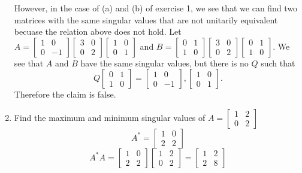 \documentclass[12pt]{article}
\numberwithin{equation}{section}
\begin{document}
\begin{enumerate}
    However, in the case of (a) and (b) of exercise 1, we see that we can find two matrices with the same singular values that are not unitarily equivalent becuase the relation above does not hold. Let $A=\left[\begin{array}{cc}1&0\\0&-1\end{array}\right]\left[\begin{array}{cc}3&0\\0&2\end{array}\right]\left[\begin{array}{cc}1&0\\0&1\end{array}\right]$ and $B=\left[\begin{array}{cc}0&1\\1&0\end{array}\right]\left[\begin{array}{cc}3&0\\0&2\end{array}\right]\left[\begin{array}{cc}0&1\\1&0\end{array}\right]$. We see that $A$ and $B$ have the same singular values, but there is no $Q$ such that
    $$Q\left[\begin{array}{cc}0&1\\1&0\end{array}\right]=\left[\begin{array}{cc}1&0\\0&-1\end{array}\right],\left[\begin{array}{cc}1&0\\0&1\end{array}\right].$$
    Therefore the claim is false.
\item Find the maximum and minimum singular values of $A=\left[\begin{array}{cc}1&2\\0&2\end{array}\right]$\\
    $$A^*=\left[\begin{array}{cc}1&0\\2&2\end{array}\right]$$
    $$A^*A=\left[\begin{array}{cc}1&0\\2&2\end{array}\right]\left[\begin{array}{cc}1&2\\0&2\end{array}\right]=\left[\begin{array}{cc}1&2\\2&8\end{array}\right]$$

\end{enumerate}
\end{document}
